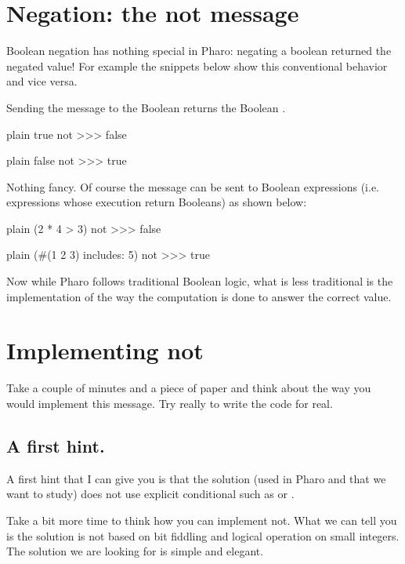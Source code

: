 \documentclass[10pt,twoside,english]{_support/latex/sbabook/sbabook}
\begin{document}
\section{Negation: the not message}
Boolean negation has nothing special in Pharo: negating a boolean returned the negated value! 
For example the snippets below show this conventional behavior and vice versa.

Sending the message  to the Boolean  returns the Boolean . 

\begin{displaycode}{plain}
true not
>>> false
\end{displaycode}

\begin{displaycode}{plain}
false not
>>> true
\end{displaycode}

Nothing fancy. Of course the message  can be sent to Boolean expressions (i.e. expressions whose execution return Booleans) as shown below:

\begin{displaycode}{plain}
(2 * 4 > 3) not
>>> false
\end{displaycode}

\begin{displaycode}{plain}
(#(1 2 3) includes: 5) not
>>> true
\end{displaycode}

Now while Pharo follows traditional Boolean logic, what is less traditional is the implementation of the way the computation is done to answer the correct value.
\section{Implementing not}
Take a couple of minutes and a piece of paper and think about the way you would implement this message. Try really to write the code for real.
\subsection{A first hint. }
A first hint that I can give you is that the solution (used in Pharo and that we want to study) does not use explicit conditional such as  or .

Take a bit more time to think how you can implement not. 
What we can tell you is the solution is not based on bit fiddling and logical operation on small integers. The solution we are looking for is simple and elegant.
\end{document}
